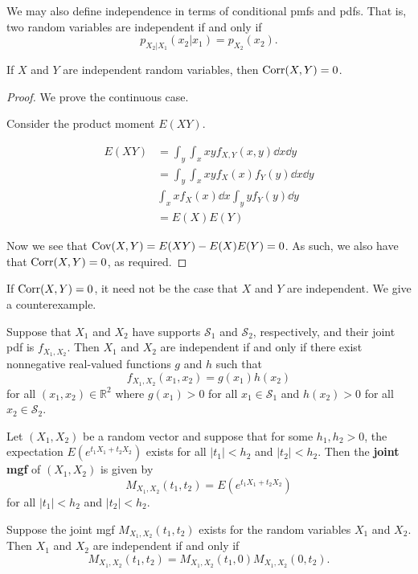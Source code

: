We may also define independence in terms of conditional pmfs and pdfs. That is, two random variables are independent if and only if
$$p_{X_2|X_1}(x_2|x_1)=p_{X_2}(x_2).$$

\begin{theorem}[]
	If $X$ and $Y$ are independent random variables, then $\operatorname{Corr}(X,Y)=0$.
\end{theorem}

\begin{proof}
	We prove the continuous case.

	Consider the product moment $E(XY)$.

	\begin{align*}
		E(XY)&=\int_y\int_xxyf_{X,Y}(x,y)\dd x\dd y\\
		&=\int_y\int_xxyf_{X}(x)f_Y(y)\dd x\dd y\\
		&\int_xxf_X(x)\dd x\int_yyf_Y(y)\dd y\\
		&=E(X)E(Y)
	\end{align*}

	Now we see that $\operatorname{Cov}(X,Y)=E(XY)-E(X)E(Y)=0$. As such, we also have that $\operatorname{Corr}(X,Y)=0$, as required.
\end{proof}

If $\operatorname{Corr}(X,Y)=0$, it need not be the case that $X$ and $Y$ are independent. We give a counterexample.

\begin{theorem}[]
	Suppose that $X_1$ and $X_2$ have supports $\mathcal S_1$ and $\mathcal S_2$, respectively, and their joint pdf is $f_{X_1,X_2}$. Then $X_1$ and $X_2$ are independent if and only if there exist nonnegative real-valued functions $g$ and $h$ such that $$f_{X_1,X_2}(x_1,x_2)=g(x_1)h(x_2)$$ for all $(x_1,x_2)\in\mathbb R^2$ where $g(x_1)>0$ for all $x_1\in\mathcal S_1$ and $h(x_2)>0$ for all $x_2\in\mathcal S_2$.
\end{theorem}

\begin{definition}
	Let $(X_1,X_2)$ be a random vector and suppose that for some $h_1,h_2>0$, the expectation $E(e^{t_1X_1+t_2X_2})$ exists for all $|t_1|<h_2$ and $|t_2|<h_2$. Then the \textbf{joint mgf} of $(X_1,X_2)$ is given by
	$$M_{X_1,X_2}(t_1,t_2)=E(e^{t_1X_1+t_2X_2})$$
	for all $|t_1|<h_2$ and $|t_2|<h_2$.
\end{definition}

\begin{theorem}[]
	Suppose the joint mgf $M_{X_1,X_2}(t_1,t_2)$ exists for the random variables $X_1$ and $X_2$. Then $X_1$ and $X_2$ are independent if and only if $$M_{X_1,X_2}(t_1,t_2)=M_{X_1,X_2}(t_1,0)M_{X_1,X_2}(0,t_2).$$
\end{theorem}

